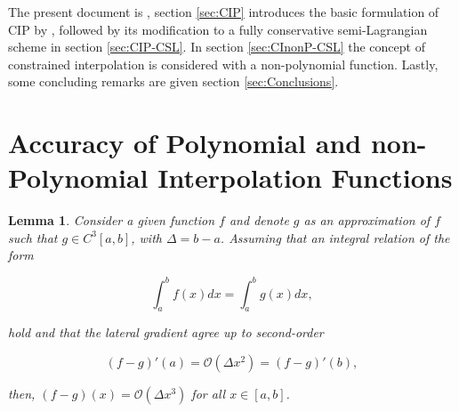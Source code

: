 \documentclass[10pt,a4paper]{article}
\newtheorem{lemma}{Lemma}
\begin{document}
The present document is , section \ref{sec:CIP} introduces the basic formulation of CIP by \cite{Yabe1991}, followed by its modification to a fully conservative semi-Lagrangian scheme in section \ref{sec:CIP-CSL}. In section \ref{sec:CInonP-CSL} the concept of constrained interpolation is considered with a non-polynomial function. Lastly, some concluding remarks are given section \ref{sec:Conclusions}.

\section{Accuracy of Polynomial and non-Polynomial Interpolation Functions}

\begin{lemma} 
Consider a given function $f$ and denote $g$ as an approximation of $f$ such that $g\in C^3[a,b]$, with $\Delta=b-a$. Assuming that an integral relation of the form
%
\begin{linenomath}
\begin{equation}
	\int_{a}^{b} f(x)dx = \int_{a}^{b} g(x)dx,
\end{equation}
\end{linenomath}
%
hold and that the lateral gradient agree up to second-order
%
\begin{linenomath}
\begin{equation}
	(f-g)'(a) = \mathcal{O}(\Delta x^2) = (f-g)'(b),
	\label{eq:lateralgradientsAssumption}
\end{equation}
\end{linenomath}
%
then, $(f-g)(x) = \mathcal{O}(\Delta x^3)$ for all $x\in[a,b]$.
\end{lemma}
\end{document}
